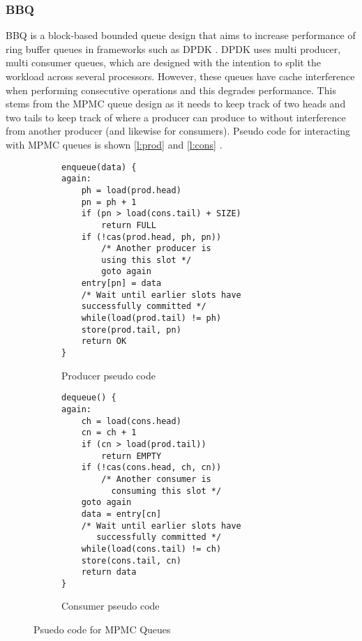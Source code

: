 \subsubsection{BBQ}
BBQ is a block-based bounded queue design that aims to increase performance of ring buffer queues in frameworks such
as DPDK \cite{Wang_BFOOLCHC_22}. DPDK uses multi producer, multi consumer queues, which are designed with the
intention to split the workload across several processors. However, these queues have cache interference when
performing consecutive operations and this degrades performance. This stems from the MPMC queue design as it needs to keep track of
two heads and two tails to keep track of where a producer can produce to without interference from another producer (and
likewise for consumers). Pseudo code for interacting with MPMC queues is shown \autoref{l:prod} and \autoref{l:cons} 
\cite{Wang_BFOOLCHC_22}.


\begin{figure} [H]
	\begin{multicols}{2}
		\begin{subfigure}{0.45\textwidth}
		\begin{verbatim}
enqueue(data) {
again:
    ph = load(prod.head)
    pn = ph + 1
    if (pn > load(cons.tail) + SIZE)
	    return FULL
    if (!cas(prod.head, ph, pn))
        /* Another producer is 
        using this slot */
        goto again
    entry[pn] = data
    /* Wait until earlier slots have
    successfully committed */
    while(load(prod.tail) != ph)
    store(prod.tail, pn)
    return OK
}
    \end{verbatim}
    \caption{Producer pseudo code}
    \label{l:prod}
    \end{subfigure}

    \begin{subfigure}{0.45\textwidth}
    \begin{verbatim}
dequeue() {
again:
    ch = load(cons.head)
    cn = ch + 1
    if (cn > load(prod.tail))
        return EMPTY
    if (!cas(cons.head, ch, cn))
        /* Another consumer is 
          consuming this slot */
    goto again
    data = entry[cn]
    /* Wait until earlier slots have 
       successfully committed */
    while(load(cons.tail) != ch)
    store(cons.tail, cn)
    return data
}
    \end{verbatim}
    \caption{Consumer pseudo code}
    \label{l:cons}
    \end{subfigure}
\end{multicols}
\caption{Psuedo code for MPMC Queues}
\label{l:mpmc}
\end{figure}


